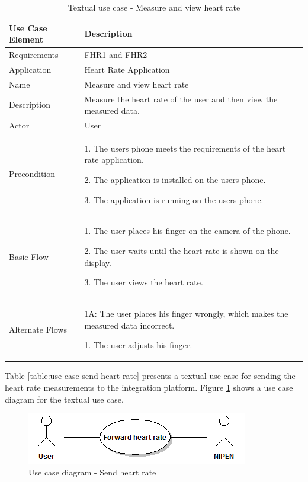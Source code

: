 \begin{table}[H]
\begin{center}
\begin{tabular}{ l | p{10cm} }
  \hline
  \textbf{Use Case Element} & \textbf{Description} \\ \hline\hline
  Requirements & \hyperref[table:reqheartrate]{FHR1} and \hyperref[table:reqheartrate]{FHR2} \\ \hline
  Application & Heart Rate Application \\ \hline
  Name & Measure and view heart rate \\ \hline
  Description & Measure the heart rate of the user and then view the measured data. \\ \hline
  Actor & User \\ \hline
  Precondition &
    \par 1. The users phone meets the requirements of the heart rate application.
  	\par 2. The application is installed on the users phone.
  	\par 3. The application is running on the users phone.
  \\ \hline
  Basic Flow & 
  	\par 1. The user places his finger on the camera of the phone.
  	\par 2. The user waits until the heart rate is shown on the display.
  	\par 3. The user views the heart rate.
  \\ \hline
  Alternate Flows & 
  	\par 1A: The user places his finger wrongly, which makes the measured data incorrect.
  	\par\hspace{15pt} 1. The user adjusts his finger.
  \\ \hline
\end{tabular}
\end{center}
\caption{Textual use case - Measure and view heart rate}
\label{table:use-case-measure-heart-rate}
\end{table}

Table \ref{table:use-case-send-heart-rate} presents a textual use case for sending the heart rate measurements to
the integration platform. Figure \ref{figure:use-case-diagram-send-heart-rate} shows a use case diagram for the textual use case.

\begin{figure}[H]
\centering
\includegraphics[scale=0.75]{../Figures/use-case-diagram-send-heart-rate.png}
\caption{Use case diagram - Send heart rate}
\label{figure:use-case-diagram-send-heart-rate}
\end{figure}

